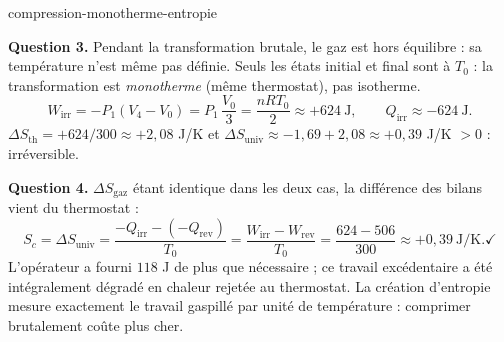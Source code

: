 \begin{exo}{compression-monotherme-entropie}
\begin{solution}
\textbf{Question 3.} Pendant la transformation brutale, le gaz est hors équilibre : sa température n'est même pas définie. Seuls les états initial et final sont à $T_0$ : la transformation est \emph{monotherme} (même thermostat), pas isotherme.
\[
W_{\text{irr}} = -P_1(V_4 - V_0) = P_1\,\frac{V_0}{3} = \frac{nRT_0}{2} \approx +624\ \text{J}, \qquad Q_{\text{irr}} \approx -624\ \text{J}.
\]
$\Delta S_{\text{th}} = +624/300 \approx +2{,}08$ J/K et $\Delta S_{\text{univ}} \approx -1{,}69 + 2{,}08 \approx +0{,}39$ J/K $> 0$ : irréversible.

\textbf{Question 4.} $\Delta S_{\text{gaz}}$ étant identique dans les deux cas, la différence des bilans vient du thermostat :
\[
S_c = \Delta S_{\text{univ}} = \frac{-Q_{\text{irr}} - (-Q_{\text{rev}})}{T_0} = \frac{W_{\text{irr}} - W_{\text{rev}}}{T_0} = \frac{624 - 506}{300} \approx +0{,}39\ \text{J/K}. \checkmark
\]
L'opérateur a fourni $118$ J de plus que nécessaire ; ce travail excédentaire a été intégralement dégradé en chaleur rejetée au thermostat. La création d'entropie mesure exactement le travail gaspillé par unité de température : comprimer brutalement coûte plus cher.
\end{solution}
\end{exo}

